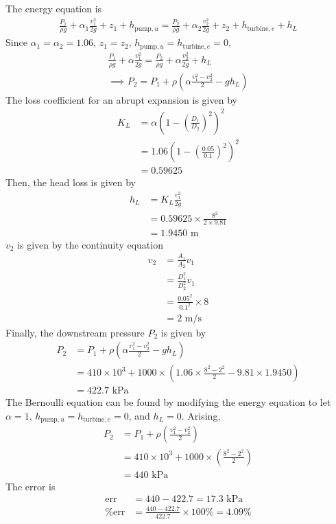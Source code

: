 The energy equation is
\begin{gather*}
    \frac{P_1}{\rho g} + \alpha_1 \frac{v_1^2}{2g} + z_1 + h_{\text{pump}, u} 
    = \frac{P_2}{\rho g} + \alpha_2 \frac{v_2^2}{2g} + z_2 + h_{\text{turbine}, e} + h_L
\end{gather*}
Since $\alpha_1 = \alpha_2 = 1.06$, $z_1 = z_2$, $h_{\text{pump}, u} = h_{\text{turbine}, e} = 0$, 
\begin{gather*}    
    \frac{P_1}{\rho g} + \alpha \frac{v_1^2}{2g} = \frac{P_2}{\rho g} + \alpha \frac{v_2^2}{2g} + h_L\\
    \implies P_2 = P_1 + \rho \left(\alpha \frac{v_1^2 - v_2^2}{2} - g h_L\right)
\end{gather*}
The loss coefficient for an abrupt expansion is given by
\begin{align*}
    K_L &= \alpha \left(1 - \left(\frac{D_1}{D_2}\right)^2\right)^2\\
    &= 1.06 \left(1 - \left(\frac{0.05}{0.1}\right)^2\right)^2\\
    &= 0.59625
\end{align*}
Then, the head loss is given by
\begin{align*}
    h_L &= K_L \frac{v_1^2}{2g} \\
    &= 0.59625 \times \frac{8^2}{2 \times 9.81} \\
    &= 1.9450 \text{ m}
\end{align*}
$v_2$ is given by the continuity equation
\begin{align*}
    v_2 &= \frac{A_1}{A_2} v_1 \\
    &= \frac{D_1^2}{D_2^2} v_1 \\
    &= \frac{0.05^2}{0.1^2} \times 8 \\
    &= 2 \text{ m/s}
\end{align*}
Finally, the downstream pressure $P_2$ is given by
\begin{align*}
    P_2 &= P_1 + \rho \left(\alpha \frac{v_1^2 - v_2^2}{2} - g h_L\right) \\
    &= 410 \times 10^3 + 1000 \times \left(1.06 \times \frac{8^2 - 2^2}{2} - 9.81 \times 1.9450\right) \\
    &= \boxed{422.7 \text{ kPa}}
\end{align*}
The Bernoulli equation can be found by modifying the energy equation to let $\alpha = 1$, $h_{\text{pump}, u} = h_{\text{turbine}, e} = 0$, and $h_L = 0$. 
Arising,
\begin{align*}
    P_2 &= P_1 + \rho \left(\frac{v_1^2 - v_2^2}{2}\right) \\
    &= 410 \times 10^3 + 1000 \times \left(\frac{8^2 - 2^2}{2}\right) \\
    &= \boxed{440 \text{ kPa}}
\end{align*}
The error is
\begin{align*}
    \text{err} &= 440 - 422.7 = \boxed{17.3 \text{ kPa}} \\
    \% \text{err} &= \frac{440 - 422.7}{422.7} \times 100\% = \boxed{4.09\%}
\end{align*}
